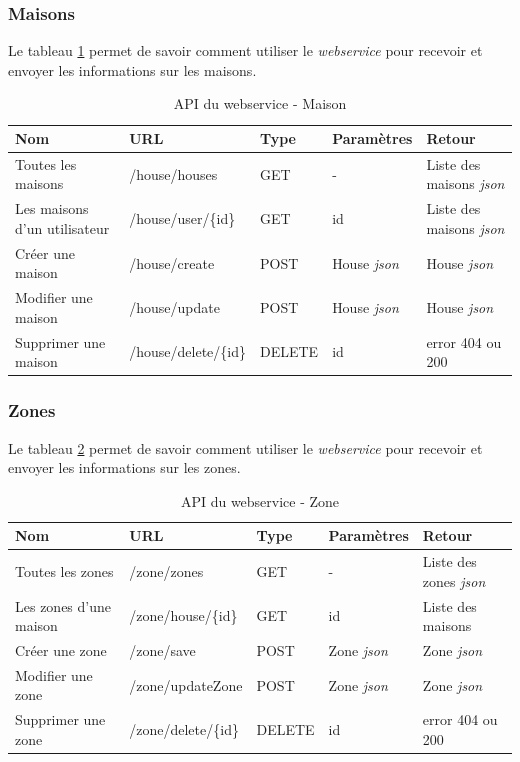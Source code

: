 \subsubsection{Maisons}
Le tableau \ref{tab:apiMaison} permet de savoir comment utiliser le \emph{\gls{webservice}} pour recevoir et envoyer les informations sur les maisons.

\begin{table}[H]
\begin{tabularx}{\textwidth}{|X|m{3cm}|X|X|X|}
  \hline
  \bf{Nom}  & \bf{URL} & \bf{Type} & \bf{Paramètres} & \bf{Retour} \\
  \hline  
  Toutes les maisons  & /house/houses & GET &  - & Liste des maisons \emph{\gls{json}} \\
  \hline
 Les maisons d'un utilisateur  & /house/user/\{id\} & GET &  id & Liste des maisons \emph{\gls{json}} \\
  \hline 
 Créer une maison  & /house/create & POST & House \emph{\gls{json}} & House \emph{\gls{json}} \\
  \hline 
 Modifier une maison  & /house/update & POST & House \emph{\gls{json}} & House \emph{\gls{json}} \\
  \hline   
 Supprimer une maison  & /house/delete/\{id\} & DELETE &  id & error 404 ou 200 \\
  \hline  
\end{tabularx}
\caption{API du webservice - Maison}
\label{tab:apiMaison}
\end{table}

\subsubsection{Zones}
Le tableau \ref{tab:apiZone} permet de savoir comment utiliser le \emph{\gls{webservice}} pour recevoir et envoyer les informations sur les zones.

\begin{table}[H]
\begin{tabularx}{\textwidth}{|X|X|X|X|X|}
  \hline
  \bf{Nom}  & \bf{URL} & \bf{Type} & \bf{Paramètres} & \bf{Retour} \\
  \hline  
  Toutes les zones  & /zone/zones & GET &  - & Liste des zones \emph{\gls{json}} \\
  \hline
 Les zones d'une maison  & /zone/house/\{id\} & GET &  id & Liste des maisons \\
  \hline 
 Créer une zone  & /zone/save & POST & Zone \emph{\gls{json}} & Zone \emph{\gls{json}} \\
  \hline 
 Modifier une zone  & /zone/updateZone & POST & Zone \emph{\gls{json}} & Zone \emph{\gls{json}} \\
  \hline   
 Supprimer une zone  & /zone/delete/\{id\} & DELETE &  id & error 404 ou 200 \\
  \hline  
\end{tabularx}
\caption{API du webservice - Zone}
\label{tab:apiZone}
\end{table}

